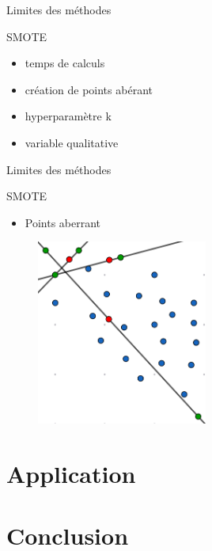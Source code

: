 \documentclass{beamer}
\begin{document}
\begin{frame}{Limites des méthodes}
\begin{block}{SMOTE}
    \begin{itemize}
    \item temps de calculs 
     \item création de points abérant 
     \item hyperparamètre k 
     \item variable qualitative
     \end{itemize} 
\end{block}
    
\end{frame}

\begin{frame}{Limites des méthodes}
\begin{block}{SMOTE}
    \begin{itemize}
       \item Points aberrant 
   \end{itemize}  
\end{block}
    
    \begin{figure}
    \centering
    \includegraphics[width=0.5\textwidth]{images/lsmote.png}

\end{figure}
\end{frame}



\section{Application}


\section{Conclusion}
\end{document}
